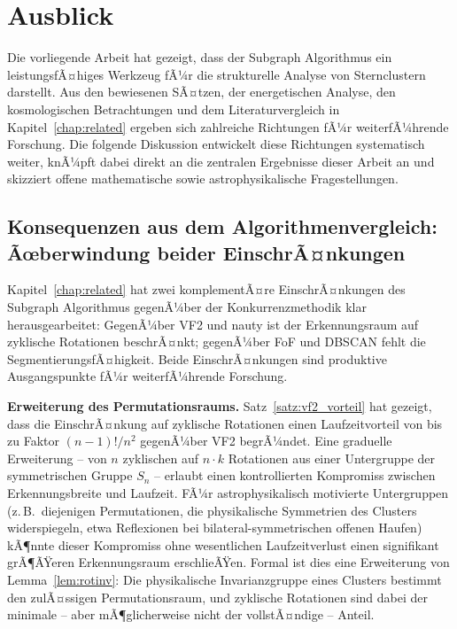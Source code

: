 ﻿\documentclass[a4paper,12pt]{report}
\theoremstyle{definition}
\begin{document}
\section{Ausblick}

Die vorliegende Arbeit hat gezeigt, dass der Subgraph Algorithmus ein leistungsfÃ¤higes Werkzeug fÃ¼r die strukturelle Analyse von Sternclustern darstellt. Aus den bewiesenen SÃ¤tzen, der energetischen Analyse, den kosmologischen Betrachtungen und dem Literaturvergleich in Kapitel~\ref{chap:related} ergeben sich zahlreiche Richtungen fÃ¼r weiterfÃ¼hrende Forschung. Die folgende Diskussion entwickelt diese Richtungen systematisch weiter, knÃ¼pft dabei direkt an die zentralen Ergebnisse dieser Arbeit an und skizziert offene mathematische sowie astrophysikalische Fragestellungen.

\subsection{Konsequenzen aus dem Algorithmenvergleich: Ãœberwindung beider EinschrÃ¤nkungen}
\label{ssec:ausblick_related}

Kapitel~\ref{chap:related} hat zwei komplementÃ¤re EinschrÃ¤nkungen des Subgraph Algorithmus gegenÃ¼ber der Konkurrenzmethodik klar herausgearbeitet: GegenÃ¼ber VF2 und nauty ist der Erkennungsraum auf zyklische Rotationen beschrÃ¤nkt; gegenÃ¼ber FoF und DBSCAN fehlt die SegmentierungsfÃ¤higkeit. Beide EinschrÃ¤nkungen sind produktive Ausgangspunkte fÃ¼r weiterfÃ¼hrende Forschung.

\textbf{Erweiterung des Permutationsraums.} Satz~\ref{satz:vf2_vorteil} hat gezeigt, dass die EinschrÃ¤nkung auf zyklische Rotationen einen Laufzeitvorteil von bis zu Faktor $(n-1)!/n^2$ gegenÃ¼ber VF2 begrÃ¼ndet. Eine graduelle Erweiterung -- von $n$ zyklischen auf $n \cdot k$ Rotationen aus einer Untergruppe der symmetrischen Gruppe $S_n$ -- erlaubt einen kontrollierten Kompromiss zwischen Erkennungsbreite und Laufzeit. FÃ¼r astrophysikalisch motivierte Untergruppen (z.\,B.\ diejenigen Permutationen, die physikalische Symmetrien des Clusters widerspiegeln, etwa Reflexionen bei bilateral-symmetrischen offenen Haufen) kÃ¶nnte dieser Kompromiss ohne wesentlichen Laufzeitverlust einen signifikant grÃ¶ÃŸeren Erkennungsraum erschlieÃŸen. Formal ist dies eine Erweiterung von Lemma~\ref{lem:rotinv}: Die physikalische Invarianzgruppe eines Clusters bestimmt den zulÃ¤ssigen Permutationsraum, und zyklische Rotationen sind dabei der minimale -- aber mÃ¶glicherweise nicht der vollstÃ¤ndige -- Anteil.
\end{document}
